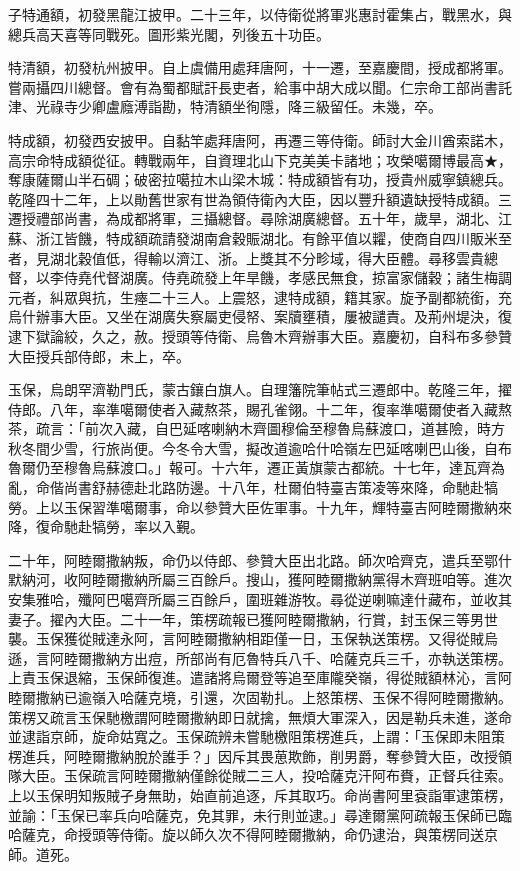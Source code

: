 \begin{pinyinscope}
子特通額，初發黑龍江披甲。二十三年，以侍衛從將軍兆惠討霍集占，戰黑水，與總兵高天喜等同戰死。圖形紫光閣，列後五十功臣。

特清額，初發杭州披甲。自上虞備用處拜唐阿，十一遷，至嘉慶間，授成都將軍。嘗兩攝四川總督。會有為蜀都賦訐長吏者，給事中胡大成以聞。仁宗命工部尚書託津、光祿寺少卿盧廕溥詣勘，特清額坐徇隱，降三級留任。未幾，卒。

特成額，初發西安披甲。自黏竿處拜唐阿，再遷三等侍衛。師討大金川酋索諾木，高宗命特成額從征。轉戰兩年，自資理北山下克美美卡諸地；攻榮噶爾博最高★，奪康薩爾山半石碉；破密拉噶拉木山梁木城：特成額皆有功，授貴州威寧鎮總兵。乾隆四十二年，上以勛舊世家有世為領侍衛內大臣，因以豐升額遺缺授特成額。三遷授禮部尚書，為成都將軍，三攝總督。尋除湖廣總督。五十年，歲旱，湖北、江蘇、浙江皆饑，特成額疏請發湖南倉穀賑湖北。有餘平值以糶，使商自四川販米至者，見湖北穀值低，得輸以濟江、浙。上獎其不分畛域，得大臣體。尋移雲貴總督，以李侍堯代督湖廣。侍堯疏發上年旱饑，孝感民無食，掠富家儲穀；諸生梅調元者，糾眾與抗，生瘞二十三人。上震怒，逮特成額，籍其家。旋予副都統銜，充烏什辦事大臣。又坐在湖廣失察屬吏侵帑、案牘壅積，屢被譴責。及荊州堤決，復逮下獄論絞，久之，赦。授頭等侍衛、烏魯木齊辦事大臣。嘉慶初，自科布多參贊大臣授兵部侍郎，未上，卒。

玉保，烏朗罕濟勒門氏，蒙古鑲白旗人。自理籓院筆帖式三遷郎中。乾隆三年，擢侍郎。八年，率準噶爾使者入藏熬茶，賜孔雀翎。十二年，復率準噶爾使者入藏熬茶，疏言：「前次入藏，自巴延喀喇納木齊圖穆倫至穆魯烏蘇渡口，道甚險，時方秋冬間少雪，行旅尚便。今冬令大雪，擬改道逾哈什哈嶺左巴延喀喇巴山後，自布魯爾仍至穆魯烏蘇渡口。」報可。十六年，遷正黃旗蒙古都統。十七年，達瓦齊為亂，命偕尚書舒赫德赴北路防邊。十八年，杜爾伯特臺吉策凌等來降，命馳赴犒勞。上以玉保習準噶爾事，命以參贊大臣佐軍事。十九年，輝特臺吉阿睦爾撒納來降，復命馳赴犒勞，率以入覲。

二十年，阿睦爾撒納叛，命仍以侍郎、參贊大臣出北路。師次哈齊克，遣兵至鄂什默納河，收阿睦爾撒納所屬三百餘戶。搜山，獲阿睦爾撒納黨得木齊班咱等。進次安集雅哈，殲阿巴噶齊所屬三百餘戶，圍班雜游牧。尋從逆喇嘛達什藏布，並收其妻子。擢內大臣。二十一年，策楞疏報已獲阿睦爾撒納，行賞，封玉保三等男世襲。玉保獲從賊達永阿，言阿睦爾撒納相距僅一日，玉保執送策楞。又得從賊烏遜，言阿睦爾撒納方出痘，所部尚有厄魯特兵八千、哈薩克兵三千，亦執送策楞。上責玉保退縮，玉保師復進。遣諸將烏爾登等追至庫隴癸嶺，得從賊額林沁，言阿睦爾撒納已逾嶺入哈薩克境，引還，次固勒扎。上怒策楞、玉保不得阿睦爾撒納。策楞又疏言玉保馳檄謂阿睦爾撒納即日就擒，無煩大軍深入，因是勒兵未進，遂命並逮詣京師，旋命姑寬之。玉保疏辨未嘗馳檄阻策楞進兵，上謂：「玉保即未阻策楞進兵，阿睦爾撒納脫於誰手？」因斥其畏葸欺飾，削男爵，奪參贊大臣，改授領隊大臣。玉保疏言阿睦爾撒納僅餘從賊二三人，投哈薩克汗阿布賚，正督兵往索。上以玉保明知叛賊孑身無助，始直前追逐，斥其取巧。命尚書阿里袞詣軍逮策楞，並諭：「玉保已率兵向哈薩克，免其罪，未行則並逮。」尋達爾黨阿疏報玉保師已臨哈薩克，命授頭等侍衛。旋以師久次不得阿睦爾撒納，命仍逮治，與策楞同送京師。道死。


\end{pinyinscope}
